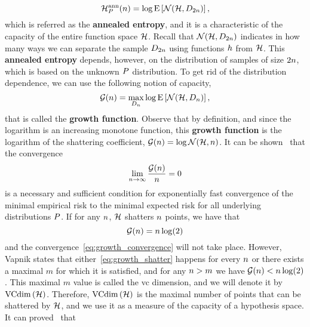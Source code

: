 \begin{equation}
    \nonumber
    \mathcal{H}^{\text{ann}}_{P}(n) = \log \operatorname{E}\left[\mathcal{N}(\mathcal{H}, D_{2 n}) \right] ,
\end{equation}
which is referred as the \textbf{annealed entropy}, and it is a characteristic of the capacity of the entire function space $\mathcal{H}$. Recall that $\mathcal{N}(\mathcal{H}, D_{2 n})$ indicates in how many ways we can separate the sample $D_{2 n}$ using functions $h$ from $\mathcal{H}$.
%
This \textbf{annealed entropy} depends, however, on the distribution of samples of size $2 n$, which is based on the unknown $P$ distribution. To get rid of the distribution dependence, we can use the following notion of capacity,
\begin{equation}
    \nonumber
    \mathcal{G}(n) = \max_{D_n} \log \operatorname{E}\left[\mathcal{N}(\mathcal{H}, D_{n})\right] , 
\end{equation}
that is called the \textbf{growth function}. Observe that by definition, and since the logarithm is an increasing monotone function, this \textbf{growth function} is the logarithm of the shattering coefficient, $\mathcal{G}(n) = \log \mathcal{N}(\mathcal{H}, n)$.
%
It can be shown~\citep{Vapnik00} that the convergence 
\begin{equation}
    \label{eq:growth_convergence}
    \lim_{\nsamples \to \infty} \frac{\mathcal{G}(\nsamples)}{\nsamples} = 0
\end{equation} 
is a necessary and sufficient condition for exponentially fast convergence of the minimal empirical risk to the minimal expected risk for all underlying distributions $P$.
%
If for any $n$,  $\mathcal{H}$ shatters $n$ points, we have that 
\begin{equation}
    \label{eq:growth_shatter}
    \mathcal{G}(\nsamples) = \nsamples \log(2)
\end{equation}
and the convergence~\eqref{eq:growth_convergence} will not take place.
However, Vapnik states that either~\eqref{eq:growth_shatter} happens for every $n$ or there exists a maximal $m$ for which it is satisfied, and for any $n > m$ we have $\mathcal{G}(n) < n \log(2)$. This maximal $m$ value is called the \acrfull{vc} dimension, and we will denote it by $\operatorname{VCdim}\left(\mathcal{H}\right)$. Therefore, $\operatorname{VCdim}\left(\mathcal{H}\right)$ is the maximal number of points that can be shattered by $\mathcal{H}$, and we use it as a measure of the capacity of a hypothesis space. It can proved~\citep{Vapnik00} that 
